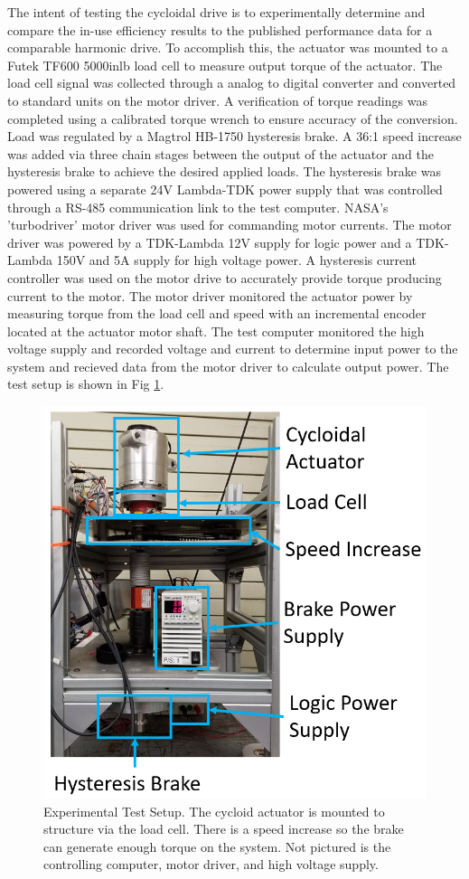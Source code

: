 The intent of testing the cycloidal drive is to experimentally determine and compare the in-use efficiency results to the published performance data for a comparable harmonic drive.
To accomplish this, the actuator was mounted to a Futek TF600 5000inlb load cell to measure output torque of the actuator.
The load cell signal was collected through a analog to digital converter and converted to standard units on the motor driver.
A verification of torque readings was completed using a calibrated torque wrench to ensure accuracy of the conversion.
Load was regulated by a Magtrol HB-1750 hysteresis brake.
A 36:1 speed increase was added via three chain stages between the output of the actuator and the hysteresis brake to achieve the desired applied loads.
The hysteresis brake was powered using a separate 24V Lambda-TDK power supply that was controlled through a RS-485 communication link to the test computer.
NASA's 'turbodriver' motor driver was used for commanding motor currents.
The motor driver was powered by a TDK-Lambda 12V supply for logic power and a TDK-Lambda 150V and 5A supply for high voltage power.
A hysteresis current controller was used on the motor drive to accurately provide torque producing current to the motor.
The motor driver monitored the actuator power by measuring torque from the load cell and speed with an incremental encoder located at the actuator motor shaft.
The test computer monitored the high voltage supply and recorded voltage and current to determine input power to the system and recieved data from the motor driver to calculate output power.
The test setup is shown in Fig \ref{fig:test_setup}.

\begin{figure}[!b]
   \centering
   \includegraphics[width=0.75\linewidth]{fig/test_stand}
   \caption{Experimental Test Setup.
   The cycloid actuator is mounted to structure via the load cell.
   There is a speed increase so the brake can generate enough torque on the system.
   Not pictured is the controlling computer, motor driver, and high voltage supply.}
   \label{fig:test_setup}
\end{figure}

